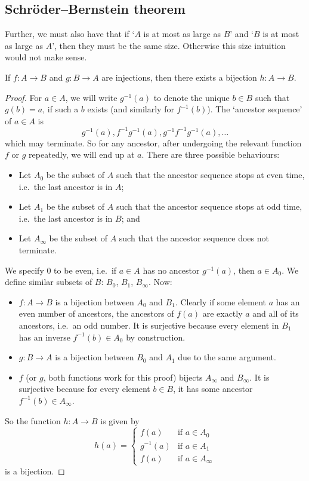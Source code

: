 \subsection{Schr\"oder--Bernstein theorem}
Further, we must also have that if `\(A\) is at most as large as \(B\)' and `\(B\) is at most as large as \(A\)', then they must be the same size.
Otherwise this size intuition would not make sense.
\begin{theorem}
	If \(f\colon A\to B\) and \(g\colon B\to A\) are injections, then there exists a bijection \(h\colon A\to B\).
\end{theorem}
\begin{proof}
	For \(a\in A\), we will write \(g^{-1}(a)\) to denote the unique \(b \in B\) such that \(g(b) = a\), if such a \(b\) exists (and similarly for \(f^{-1}(b)\)).
	The `ancestor sequence' of \(a \in A\) is
	\[g^{-1}(a), f^{-1}g^{-1}(a), g^{-1}f^{-1}g^{-1}(a), \dots\]
	which may terminate.
	So for any ancestor, after undergoing the relevant function \(f\) or \(g\) repeatedly, we will end up at \(a\).
	There are three possible behaviours:
	\begin{itemize}
		\item Let \(A_0\) be the subset of \(A\) such that the ancestor sequence stops at even time, i.e.\ the last ancestor is in \(A\);
		\item Let \(A_1\) be the subset of \(A\) such that the ancestor sequence stops at odd time, i.e.\ the last ancestor is in \(B\); and
		\item Let \(A_\infty\) be the subset of \(A\) such that the ancestor sequence does not terminate.
	\end{itemize}
	We specify 0 to be even, i.e.\ if \(a\in A\) has no ancestor \(g^{-1}(a)\), then \(a \in A_0\).
	We define similar subsets of \(B\): \(B_0\), \(B_1\), \(B_\infty\).
	Now:
	\begin{itemize}
		\item \(f\colon A \to B\) is a bijection between \(A_0\) and \(B_1\).
		      Clearly if some element \(a\) has an even number of ancestors, the ancestors of \(f(a)\) are exactly \(a\) and all of its ancestors, i.e.\ an odd number.
		      It is surjective because every element in \(B_1\) has an inverse \(f^{-1}(b) \in A_0\) by construction.
		\item \(g\colon B \to A\) is a bijection between \(B_0\) and \(A_1\) due to the same argument.
		\item \(f\) (or \(g\), both functions work for this proof) bijects \(A_\infty\) and \(B_\infty\).
		      It is surjective because for every element \(b \in B\), it has some ancestor \(f^{-1}(b) \in A_\infty\).
	\end{itemize}
	So the function \(h\colon A \to B\) is given by
	\[
		h(a) = \begin{cases}
			f(a)      & \text{if } a \in A_0      \\
			g^{-1}(a) & \text{if } a \in A_1      \\
			f(a)      & \text{if } a \in A_\infty
		\end{cases}
	\]
	is a bijection.
\end{proof}
